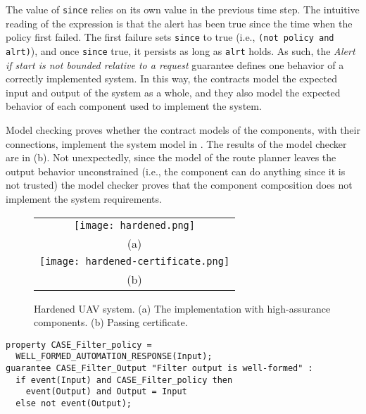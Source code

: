 The value of \texttt{since} relies on its own value in the previous time step. The intuitive reading of the expression is that the alert has been true since the time when the policy first failed. The first failure sets \texttt{since} to true (i.e., \texttt{(not policy and alrt)}), and once \texttt{since} true, it persists as long as \texttt{alrt} holds. As such, the \emph{Alert if start is not bounded relative to a request} guarantee defines one behavior of a correctly implemented system. In this way, the contracts model the expected input and output of the system as a whole, and they also model the expected behavior of each component used to implement the system.

Model checking proves whether the contract models of the components, with their connections, implement the system model in . The results of the model checker are in (b). Not unexpectedly, since the model of the route planner leaves the output behavior unconstrained (i.e., the component can do anything since it is not trusted) the model checker proves that the component composition does not implement the system requirements.

\begin{figure*}
  \begin{center}
    \begin{tabular}{c}
      \texttt{[image: hardened.png]} \\
      (a) \\
      \texttt{[image: hardened-certificate.png]} \\
      (b)
    \end{tabular}
  \end{center}
  \caption{Hardened UAV system. (a) The implementation with high-assurance components. (b) Passing certificate.}
  \label{fig:hardened}
\end{figure*}

\newsavebox{\flt}
\begin{lrbox}{\flt}
\begin{lstlisting}[style=agree]
property CASE_Filter_policy = 
  WELL_FORMED_AUTOMATION_RESPONSE(Input);
guarantee CASE_Filter_Output "Filter output is well-formed" :
  if event(Input) and CASE_Filter_policy then
    event(Output) and Output = Input
  else not event(Output);
\end{lstlisting}
\end{lrbox}

